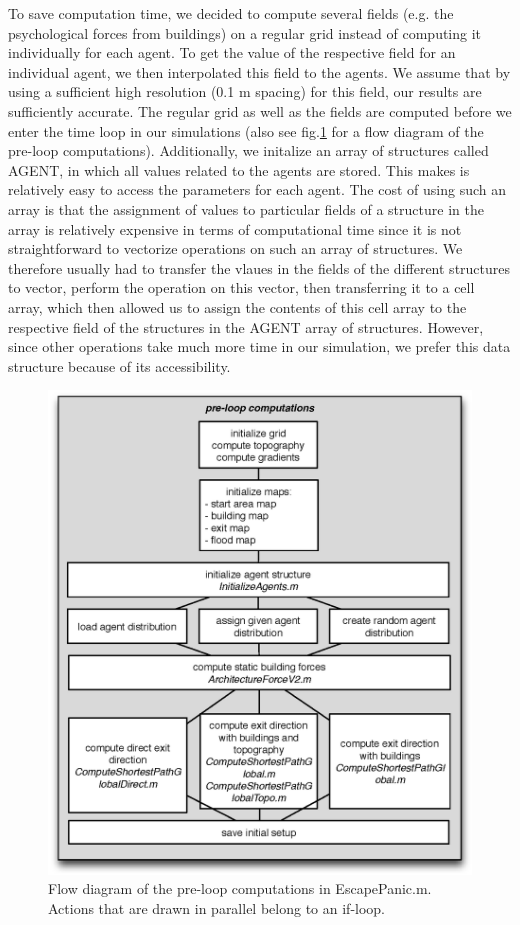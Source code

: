 \documentclass[11pt]{article}
\begin{document}
To save computation time, we decided to compute several fields (e.g. the psychological forces from buildings) on a regular grid instead of computing it individually for each agent. To get the value of the respective field for an individual agent, we then interpolated this field to the agents. We assume that by using a sufficient high resolution (0.1 m spacing) for this field, our results are sufficiently accurate. The regular grid as well as the fields are computed before we enter the time loop in our simulations (also see fig.\ref{fig:pre-loop} for a flow diagram of the pre-loop computations). Additionally, we initalize an array of structures called AGENT, in which all values related to the agents are stored. This makes is relatively easy to access the parameters for each agent. The cost of using such an array is that the assignment of values to particular fields of a structure in the array is relatively expensive in terms of computational time since it is not straightforward to vectorize operations on such an array of structures. We therefore usually had to transfer the vlaues in the fields of the different structures to vector, perform the operation on this vector, then transferring it to a cell array, which then allowed us to assign the contents of this cell array to the respective field of the structures in the AGENT array of structures. However, since other operations take much more time in our simulation, we prefer this data structure because of its accessibility.\\
\begin{figure}
\centering
\includegraphics[height=0.5\textheight]{figures/PreLoopComputations}
\caption{Flow diagram of the pre-loop computations in EscapePanic.m. Actions that are drawn in parallel belong to an if-loop.}
\label{fig:pre-loop}
\end{figure}
\end{document}
